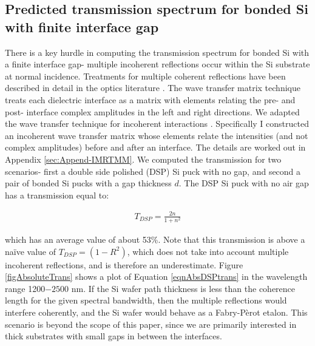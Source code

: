 \documentclass[osajnl,preprint,showpacs,superscriptaddress,12pt]{revtex4-1} %
\begin{document}
\subsection{Predicted transmission spectrum for bonded Si with finite interface gap}
\label{secTheory}
There is a key hurdle in computing the transmission spectrum for bonded Si with a finite interface gap- multiple incoherent reflections occur within the Si substrate at normal incidence.  Treatments for multiple coherent reflections have been described in detail in the optics literature \cite{2007fuph.book.....S}.  The wave transfer matrix technique treats each dielectric interface as a matrix with elements relating the pre- and post- interface complex amplitudes in the left and right directions.  We adapted the wave transfer technique for incoherent interactions \cite{2002ApOpt..41.3978K}.  Specifically I constructed an incoherent wave transfer matrix whose elements relate the intensities (and not complex amplitudes) before and after an interface.  The details are worked out in Appendix \ref{sec:Append-IMRTMM}.  We computed the transmission for two scenarios- first a double side polished (DSP) Si puck with no gap, and second a pair of bonded Si pucks with a gap thickness $d$.  The DSP Si puck with no air gap has a transmission equal to:

\begin{eqnarray}
T_{DSP} = \frac{2n}{1+n^2} \label{eqnAbsDSPtrans}
\end{eqnarray}

which has an average value of about 53\%.  Note that this transmission is above a na\"ive value of $T_{DSP}=(1-R^2)$, which does not take into account multiple incoherent reflections, and is therefore an underestimate.  Figure \ref{figAbsoluteTrans} shows a plot of Equation \ref{eqnAbsDSPtrans} in the wavelength range 1200$-2500$ nm.  If the Si wafer path thickness is less than the coherence length for the given spectral bandwidth, then the multiple reflections would interfere coherently, and the Si wafer would behave as a Fabry-P\`erot etalon.  This scenario is beyond the scope of this paper, since we are primarily interested in thick substrates with small gaps in between the interfaces.%
\end{document}
